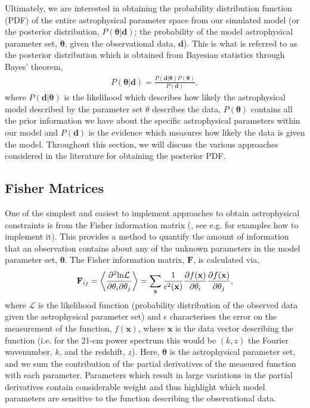 Ultimately, we are interested in obtaining the probability distribution function (PDF) of the entire astrophysical parameter space from our simulated model (or the posterior distribution, $P(\mathbf{\theta}|\mathbf{d})$; the probability of the model astrophysical parameter set, $\mathbf{\theta}$, given the observational data, $\mathbf{d}$). This is what is referred to as the posterior distribution which is obtained from Bayesian statistics through Bayes' theorem,
\begin{eqnarray} \label{eq:Bayes}
P(\mathbf{\theta}|\mathbf{d}) = \frac{P(\mathbf{\mathbf{d}|\theta})P(\mathbf{\theta})}{P(\mathbf{d})},
\end{eqnarray}
where $P(\mathbf{\mathbf{d}|\theta})$ is the likelihood which describes how likely the astrophysical model described by the parameter set $\theta$ describes the data, $P(\mathbf{\theta})$ contains all the prior information we have about the specific astrophysical parameters within our model and $P(\mathbf{d})$ is the evidence which measures how likely the data is given the model. Throughout this section, we will discuss the various approaches considered in the literature for obtaining the posterior PDF. 

\subsection{Fisher Matrices}

One of the simplest and easiest to implement approaches to obtain astrophysical constraints is from the Fisher information matrix (\cite{Fisher:1935}, see e.g. \cite{Tegmark:1997,Coe:2009} for examples how to implement it). This provides a method to quantify the amount of information that an observation contains about any of the unknown parameters in the model parameter set, $\mathbf{\theta}$. The Fisher information matrix, $\mathbf{F}$, is calculated via,
\begin{eqnarray}
\mathbf{F}_{ij} = \left\langle \frac{\partial^{2}{\rm ln}\mathcal{L}}{\partial\theta_{i}\partial\theta_{j}} \right\rangle = \sum_{\mathbf{x}} \frac{1}{\epsilon^{2}(\mathbf{x})} \frac{\partial f(\mathbf{x})}{\partial\theta_{i}} \frac{\partial f(\mathbf{x})}{\partial\theta_{j}} ,
\end{eqnarray}
where $\mathcal{L}$ is the likelihood function (probability distribution of the observed data given the astrophysical parameter set) and $\epsilon$ characterises the error on the measurement of the function, $f(\mathbf{x})$, where $\mathbf{x}$ is the data vector describing the function (i.e. for the 21-cm power spectrum this would be $(k,z)$ the Fourier wavenumber, $k$, and the redshift, $z$). Here, $\mathbf{\theta}$ is the astrophysical parameter set, and we sum the contribution of the partial derivatives of the measured function with each parameter. Parameters which result in large variations in the partial derivatives contain considerable weight and thus highlight which model parameters are sensitive to the function describing the observational data.


